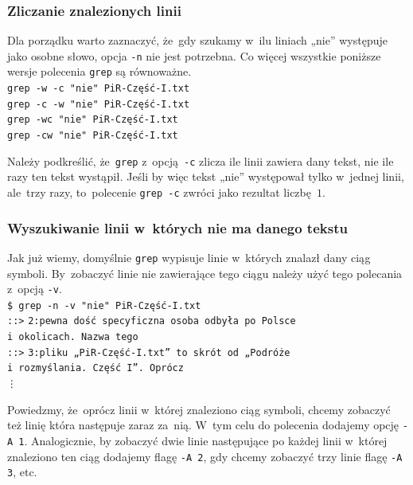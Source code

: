 \documentclass[10pt,t]{beamer}
\begin{document}
\begin{frame}
  \frametitle{Zliczanie znalezionych linii}


  Dla porządku warto zaznaczyć, że~gdy szukamy w~ilu liniach „nie”
  występuje jako osobne słowo, opcja \texttt{-n} nie jest potrzebna.
  Co więcej wszystkie poniższe wersje polecenia \texttt{grep} są
  równoważne. \\
  \texttt{grep -w -c "nie"{} PiR-Część-I.txt} \\
  \texttt{grep -c -w "nie"{} PiR-Część-I.txt} \\
  \texttt{grep -wc "nie"{} PiR-Część-I.txt} \\
  \texttt{grep -cw "nie"{} PiR-Część-I.txt}

  Należy podkreślić, że~\texttt{grep} z~opcją~\texttt{-c} zlicza ile
  \alert{linii} zawiera dany tekst, nie ile razy ten tekst wystąpił.
  Jeśli by więc tekst „nie” występował tylko w~jednej linii, ale~trzy
  razy, to~polecenie \texttt{grep -c} zwróci jako rezultat liczbę~$1$.

\end{frame}





\begin{frame}
  \frametitle{Wyszukiwanie linii w~których nie ma danego tekstu}


  Jak już wiemy, domyślnie \texttt{grep} wypisuje linie w~których znalazł
  dany ciąg symboli. By~zobaczyć linie \alert{nie} zawierające tego ciągu
  należy użyć tego polecania z~opcją \texttt{-v}. \\
  \texttt{\$ grep -n -v "nie"{} PiR-Część-I.txt} \\
  \texttt{::>} \texttt{2:pewna dość specyficzna osoba odbyła po Polsce} \\
  \texttt{i~okolicach. Nazwa tego} \\
  \texttt{::>} \texttt{3:pliku „PiR-Część-I.txt” to skrót od „Podróże} \\
  \texttt{i~rozmyślania. Część I”. Oprócz} \\
  \hspace{2em} \texttt{\vdots}

  Powiedzmy, że~oprócz linii w~której znaleziono ciąg symboli, chcemy
  zobaczyć też linię która następuje zaraz za~nią. W~tym celu do polecenia
  dodajemy opcję \texttt{-A 1}. Analogicznie, by zobaczyć dwie linie
  następujące po każdej linii w~której znaleziono ten ciąg dodajemy
  flagę \texttt{-A 2}, gdy chcemy zobaczyć trzy linie flagę
  \texttt{-A 3}, etc.

\end{frame}
\end{document}
